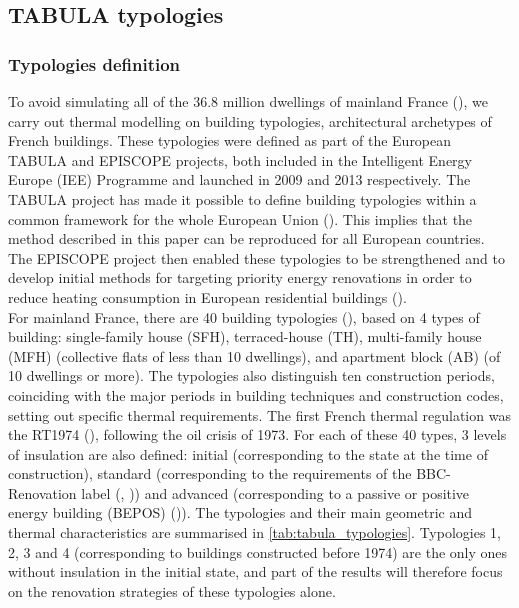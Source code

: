 \documentclass[11pt]{article}
\begin{document}

    \subsection{TABULA typologies} %
    \label{sub:tabula_typologies}
    
        \subsubsection{Typologies definition} %
        \label{ssub:typologies_definition}
        
        To avoid simulating all of the 36.8 million dwellings of mainland France (\cite{insee_378_2023}), we carry out thermal modelling on building typologies, architectural archetypes of French buildings. These typologies were defined as part of the European TABULA and EPISCOPE projects, both included in the Intelligent Energy Europe (IEE) Programme and launched in 2009 and 2013 respectively. The TABULA project has made it possible to define building typologies within a common framework for the whole European Union (\cite{loga_typology_2012}). This implies that the method described in this paper can be reproduced for all European countries. The EPISCOPE project then enabled these typologies to be strengthened and to develop initial methods for targeting priority energy renovations in order to reduce heating consumption in European residential buildings (\cite{loga_tabula_2016}). \\

        For mainland France, there are 40 building typologies (\cite{pouget_consultants_batiments_2015}), based on 4 types of building: single-family house (SFH), terraced-house (TH), multi-family house (MFH) (collective flats of less than 10 dwellings), and apartment block (AB)  (of 10 dwellings or more). The typologies also distinguish ten construction periods, coinciding with the major periods in building techniques and construction codes, setting out specific thermal requirements. The first French thermal regulation was the RT1974 (\cite{jorf_arrete_1974}), following the oil crisis of 1973. For each of these 40 types, 3 levels of insulation are also defined: initial (corresponding to the state at the time of construction), standard (corresponding to the requirements of the BBC-Renovation label (\cite{observatoire_bbc_batiments_2019}, \cite{effinergie_label_2023})) and advanced (corresponding to a passive or positive energy building (BEPOS) (\cite{observatoire_bbc_batiments_2018})). The typologies and their main geometric and thermal characteristics are summarised in \ref{tab:tabula_typologies}. Typologies 1, 2, 3 and 4 (corresponding to buildings constructed before 1974) are the only ones without insulation in the initial state, and part of the results will therefore focus on the renovation strategies of these typologies alone. 
\end{document}
